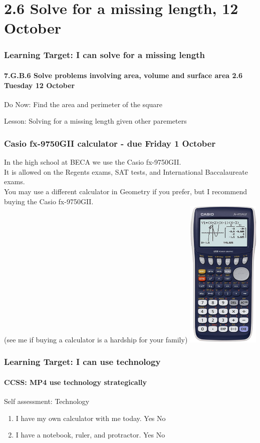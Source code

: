 \documentclass{beamer}
\begin{document}
\section{2.6 Solve for a missing length, 12 October}
\frame
{
  \frametitle{Learning Target: I can solve for a missing length}
  \framesubtitle{7.G.B.6 Solve problems involving area, volume and surface area \hfill \alert{2.6 Tuesday 12 October}}
  \begin{block}{Do Now: Find the area and perimeter of the square}
    \begin{flushleft}
    \end{flushleft}
\end{block}
  Lesson: Solving for a missing length given other paremeters
} 

  \frame
  {
    \frametitle{Casio fx-9750GII calculator - due Friday 1 October}
    \begin{multicols}{2}
    In the high school at BECA we use the Casio fx-9750GII.\\[5pt] 
    It is allowed on the Regents exams, SAT tests, and International Baccalaureate exams.\\[5pt]
    You may use a different calculator in Geometry if you prefer, but I recommend buying the Casio fx-9750GII.\\[5pt]
    (see me if buying a calculator is a hardship for your family)
    \includegraphics[width=3.5cm]{casio_fx-9750GII.png}
    \end{multicols}
  }

  \frame
  {
    \frametitle{Learning Target: I can use technology}
    \framesubtitle{CCSS: MP4 use technology strategically}
  
    \begin{block}{Self assessment: Technology}
      
      \begin{enumerate}
      \item I have my own calculator with me today. Yes \qquad No
      \item I have a notebook, ruler, and protractor. Yes \qquad No
      \end{enumerate}
    \end{block}
  }
\end{document}
